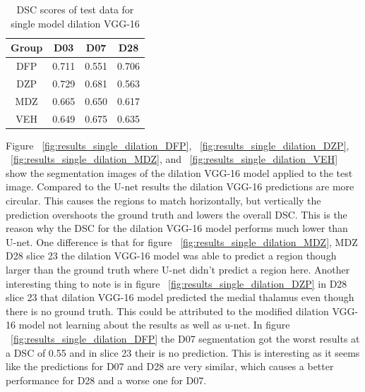\begin{table}[tbh]
\renewcommand{\arraystretch}{1}
\centering
\begin{tabular}{|c|c|c|c|}
\hline
\textbf{Group} & \textbf{D03}& \textbf{D07}& \textbf{D28}\\
\hline
DFP & 0.711 & 0.551 & 0.706\\      
\hline
DZP & 0.729 & 0.681 & 0.563\\
\hline
MDZ & 0.665 & 0.650 & 0.617\\ 
\hline
VEH & 0.649 & 0.675 & 0.635\\ 
\hline
\end{tabular}
\caption{DSC scores of test data for single model dilation VGG-16}
\label{tab.single_model_results_dilation}
\end{table}


Figure ~\ref{fig:results_single_dilation_DFP}, ~\ref{fig:results_single_dilation_DZP}, ~\ref{fig:results_single_dilation_MDZ}, and ~\ref{fig:results_single_dilation_VEH} show the segmentation images of the dilation VGG-16 model applied to the test image. 
Compared to the U-net results the dilation VGG-16 predictions are more circular. 
This causes the regions to match horizontally, but vertically the prediction overshoots the ground truth and lowers the overall DSC.
This is the reason why the DSC for the dilation VGG-16 model performs much lower than U-net.
One difference is that for figure ~\ref{fig:results_single_dilation_MDZ}, MDZ D28 slice 23 the dilation VGG-16 model was able to predict a region though larger than the ground truth where U-net didn't predict a region here. 
Another interesting thing to note is in figure ~\ref{fig:results_single_dilation_DZP} in D28 slice 23 that dilation VGG-16 model predicted the medial thalamus even though there is no ground truth.
This could be attributed to the modified dilation VGG-16 model not learning about the results as well as u-net.
In figure ~\ref{fig:results_single_dilation_DFP} the D07 segmentation got the worst results at a DSC of 0.55 and in slice 23 their is no prediction. 
This is interesting as it seems like the predictions for D07 and D28 are very similar, which causes a better performance for D28 and a worse one for D07.


